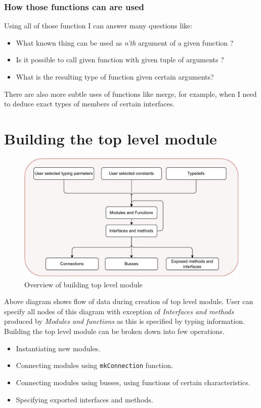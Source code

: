 \documentclass[14pt]{report}
\begin{document}
\subsubsection{How those functions can are used}
Using all of those function I can answer many questions like:
\begin{itemize}
    \item What known thing can be used as \emph{n'th} argument of a given function ?
    \item Is it possible to call given function with given tuple of arguments ?
    \item What is the resulting type of function given certain arguments?
\end{itemize}
There are also more subtle uses of functions like merge, for example, when I need to deduce exact types of members of certain interfaces.
\newpage
\section{Building the top level module}
\begin{figure}[!h]
    \centering
    \caption{Overview of building top level module}

    \includegraphics[width=1.0\columnwidth]{pdfExports/LargeMapBuilding.pdf}
\end{figure}
Above diagram shows flow of data during creation of top level module. User can specify all nodes of this diagram with exception of \emph{Interfaces and methods} produced by \emph{Modules and functions} as this is specified by typing information.
Building the top level module can be broken down into few operations.
\begin{itemize}
    \item Instantiating new modules.
    \item Connecting modules using \verb!mkConnection! function.
    \item Connecting modules using busses, using functions of certain characteristics.
    \item Specifying exported interfaces and methods.
\end{itemize} 
\end{document}
